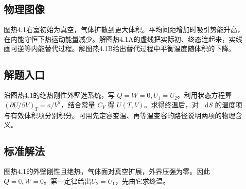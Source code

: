 \documentclass[UTF8,fontset=fandol,a4paper,11pt]{ctexart}
\newcommand{\dd}{\mathop{}\!\mathrm{d}}
\begin{document}


\subsection*{物理图像}

图热4.1右室初始为真空，气体扩散到更大体积。平均间距增加时吸引势能升高，在内能守恒下热运动能量减少。解图热4.1A的虚线把实际初、终态连起来，实线画可逆等内能替代过程。解图热4.1B给出替代过程中平衡温度随体积的下降。



\subsection*{解题入口}

沿图热4.1的绝热刚性外壁选系统，写 $Q=W=0,U_1=U_2$。利用状态方程算 $(\partial U/\partial V)_T=a/V^2$，结合常量 $C_V$ 得 $U(T,V)$。求得终温后，对 $\dd S$ 的温度项与有效体积项分别积分。可用先定容变温、再等温变容的路径说明两项的物理含义。




\subsection*{标准解法}

图热4.1的外壁刚性且绝热，气体面对真空扩展，外界压强为零。因此 $Q=0,W=0$。第一定律给出$U_2=U_1$，先由它求终温。
\end{document}
